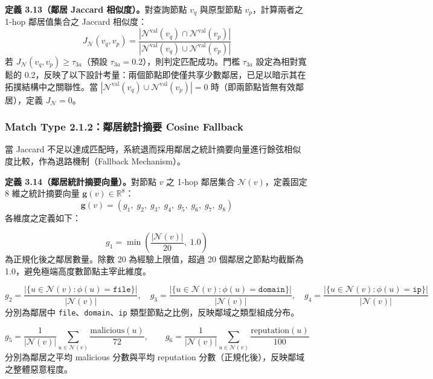 \begin{ZhChapter}
\noindent\textbf{定義 3.13（鄰居 Jaccard 相似度）。}對查詢節點 $v_q$ 與原型節點 $v_p$，計算兩者之 1-hop 鄰居值集合之 Jaccard 相似度：
\begin{equation}
    J_{\mathcal{N}}(v_q, v_p) = \frac{|\mathcal{N}^{\text{val}}(v_q) \cap \mathcal{N}^{\text{val}}(v_p)|}{|\mathcal{N}^{\text{val}}(v_q) \cup \mathcal{N}^{\text{val}}(v_p)|}
    \label{eq:neighbor-jaccard}
\end{equation}
若 $J_{\mathcal{N}}(v_q, v_p) \geq \tau_{3a}$（預設 $\tau_{3a} = 0.2$），則判定匹配成功。門檻 $\tau_{3a}$ 設定為相對寬鬆的 0.2，反映了以下設計考量：兩個節點即使僅共享少數鄰居，已足以暗示其在拓撲結構中之關聯性。當 $|\mathcal{N}^{\text{val}}(v_q) \cup \mathcal{N}^{\text{val}}(v_p)| = 0$ 時（即兩節點皆無有效鄰居），定義 $J_{\mathcal{N}} = 0$。


\subsubsection{Match Type 2.1.2：鄰居統計摘要 Cosine Fallback}

當 Jaccard 不足以達成匹配時，系統退而採用鄰居之統計摘要向量進行餘弦相似度比較，作為退路機制（Fallback Mechanism）。

\noindent\textbf{定義 3.14（鄰居統計摘要向量）。}對節點 $v$ 之 1-hop 鄰居集合 $\mathcal{N}(v)$，定義固定 8 維之統計摘要向量 $\mathbf{g}(v) \in \mathbb{R}^{8}$：
\begin{equation}
    \mathbf{g}(v) = \left( g_1,\; g_2,\; g_3,\; g_4,\; g_5,\; g_6,\; g_7,\; g_8 \right)
    \label{eq:neighbor-summary}
\end{equation}
各維度之定義如下：

\begin{equation}
    g_1 = \min\!\left(\frac{|\mathcal{N}(v)|}{20},\; 1.0\right)
    \label{eq:g1}
\end{equation}
為正規化後之鄰居數量。除數 20 為經驗上限值，超過 20 個鄰居之節點均截斷為 1.0，避免極端高度數節點主宰此維度。

\begin{equation}
    g_2 = \frac{|\{u \in \mathcal{N}(v) : \phi(u) = \texttt{file}\}|}{|\mathcal{N}(v)|}, \quad g_3 = \frac{|\{u \in \mathcal{N}(v) : \phi(u) = \texttt{domain}\}|}{|\mathcal{N}(v)|}, \quad g_4 = \frac{|\{u \in \mathcal{N}(v) : \phi(u) = \texttt{ip}\}|}{|\mathcal{N}(v)|}
    \label{eq:g234}
\end{equation}
分別為鄰居中 \texttt{file}、\texttt{domain}、\texttt{ip} 類型節點之比例，反映鄰域之類型組成分布。

\begin{equation}
    g_5 = \frac{1}{|\mathcal{N}(v)|} \sum_{u \in \mathcal{N}(v)} \frac{\text{malicious}(u)}{72}, \qquad g_6 = \frac{1}{|\mathcal{N}(v)|} \sum_{u \in \mathcal{N}(v)} \frac{\text{reputation}(u)}{100}
    \label{eq:g56}
\end{equation}
分別為鄰居之平均 malicious 分數與平均 reputation 分數（正規化後），反映鄰域之整體惡意程度。


\end{ZhChapter}
